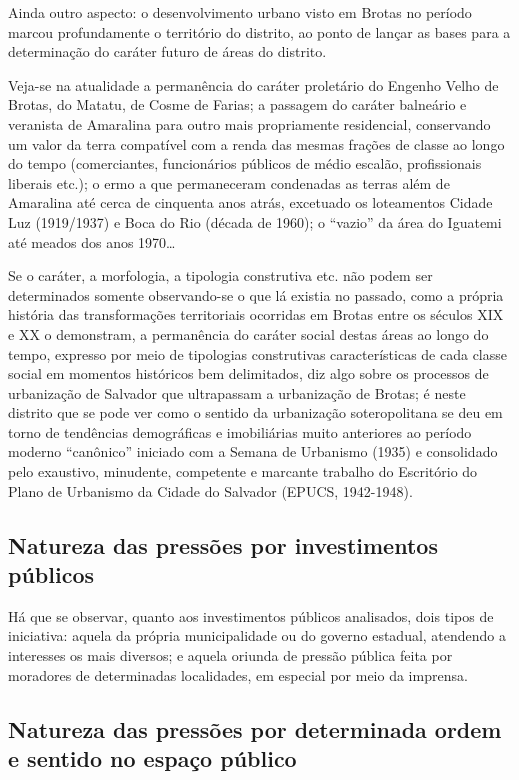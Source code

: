 Ainda outro aspecto: o desenvolvimento urbano visto em Brotas no período marcou profundamente o território do distrito, ao ponto de lançar as bases para a determinação do caráter futuro de áreas do distrito.

Veja-se na atualidade a permanência do caráter proletário do Engenho Velho de Brotas, do Matatu, de Cosme de Farias; a passagem do caráter balneário e veranista de Amaralina para outro mais propriamente residencial, conservando um valor da terra compatível com a renda das mesmas frações de classe ao longo do tempo (comerciantes, funcionários públicos de médio escalão, profissionais liberais etc.); o ermo a que permaneceram condenadas as terras além de Amaralina até cerca de cinquenta anos atrás, excetuado os loteamentos Cidade Luz (1919/1937) e Boca do Rio (década de 1960); o ``vazio'' da área do Iguatemi até meados dos anos 1970\dots

Se o caráter, a morfologia, a tipologia construtiva etc. não podem ser determinados somente observando-se o que lá existia no passado, como a própria história das transformações territoriais ocorridas em Brotas entre os séculos XIX e XX o demonstram, a permanência do caráter social destas áreas ao longo do tempo, expresso por meio de tipologias construtivas características de cada classe social em momentos históricos bem delimitados, diz algo sobre os processos de urbanização de Salvador que ultrapassam a urbanização de Brotas; é neste distrito que se pode ver como o sentido da urbanização soteropolitana se deu em torno de tendências demográficas e imobiliárias muito anteriores ao período moderno ``canônico'' iniciado com a Semana de Urbanismo (1935) e consolidado pelo exaustivo, minudente, competente e marcante trabalho do Escritório do Plano de Urbanismo da Cidade do Salvador (EPUCS, 1942-1948).


\subsection{Natureza das pressões por investimentos públicos}

Há que se observar, quanto aos investimentos públicos analisados, dois tipos de iniciativa: aquela da própria municipalidade ou do governo estadual, atendendo a interesses os mais diversos; e aquela oriunda de pressão pública feita por moradores de determinadas localidades, em especial por meio da imprensa.

\subsection{Natureza das pressões por determinada ordem e sentido no espaço público}

